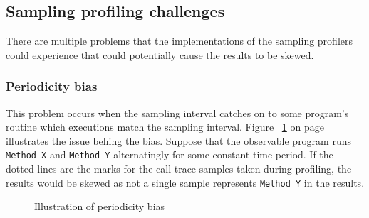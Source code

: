 \documentclass[..thesis.tex]{subfiles}
\begin{document}
\subsection{Sampling profiling challenges}
There are multiple problems that the implementations of the sampling profilers could experience that could potentially cause the results to be skewed.
\subsubsection{Periodicity bias}
This problem occurs when the sampling interval catches on to some program's routine which executions match the sampling interval. Figure ~\ref{fig:periodicityBias} on page ~\pageref{fig:periodicityBias} illustrates the issue behing the bias. Suppose that the observable program runs \texttt{Method X} and \texttt{Method Y} alternatingly for some constant time period. If the dotted lines are the marks for the call trace samples taken during profiling, the results would be skewed as not a single sample represents \texttt{Method Y} in the results.

\begin{figure}[H]
\centering
{}
\caption{Illustration of periodicity bias}
\label{fig:periodicityBias}
\end{figure}

\end{document}
